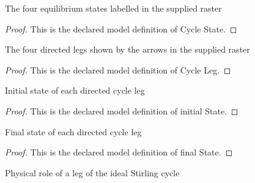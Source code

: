 \begin{definition}
  \label{def:physics:phyx-mini-0355:phyxminiproblems-problemphyxmini0355-cyclestate}
  The four equilibrium states labelled in the supplied raster
\end{definition}
\begin{proof}
  This is the declared model definition of Cycle State.
\end{proof}
\begin{definition}
  \label{def:physics:phyx-mini-0355:phyxminiproblems-problemphyxmini0355-cycleleg}
  The four directed legs shown by the arrows in the supplied raster
\end{definition}
\begin{proof}
  This is the declared model definition of Cycle Leg.
\end{proof}
\begin{definition}
  \label{def:physics:phyx-mini-0355:phyxminiproblems-problemphyxmini0355-cycleleg-initialstate}
  Initial state of each directed cycle leg
\end{definition}
\begin{proof}
  This is the declared model definition of initial State.
\end{proof}
\begin{definition}
  \label{def:physics:phyx-mini-0355:phyxminiproblems-problemphyxmini0355-cycleleg-finalstate}
  Final state of each directed cycle leg
\end{definition}
\begin{proof}
  This is the declared model definition of final State.
\end{proof}
\begin{definition}
  \label{def:physics:phyx-mini-0355:phyxminiproblems-problemphyxmini0355-processkind}
  Physical role of a leg of the ideal Stirling cycle
\end{definition}

